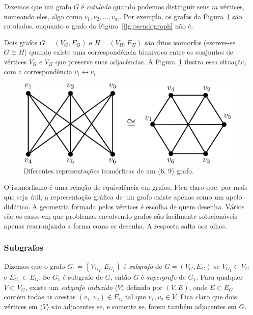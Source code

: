 \documentclass[a4paper,12pt]{article}
\begin{document}
Dizemos que um grafo $G$ é \textit{rotulado} quando podemos distinguir seus $m$ vértices, nomeando eles, algo como $v_1, v_2, \dots, v_m$. Por exemplo, os grafos da Figura~\ref{fig:graphisomorphic} são rotulados, enquanto o grafo da Figura~\ref{fig:pseudograph} não é.

Dois grafos $G = (V_G, E_G)$ e $H = (V_H, E_H)$ são ditos isomorfos (escreve-se $G \cong H$) quando existe uma correspondência biunívoca entre os conjuntos de vértices $V_G$ e $V_H$ que preserve suas adjacências. A Figura~\ref{fig:graphisomorphic} ilustra essa situação, com a correspondência $v_i \longleftrightarrow v_i$.

\begin{figure}[H]
	\begin{center}
		\includegraphics[width=0.6\linewidth]{figures/graphisomorphic.png}
	\end{center}
	\caption{Diferentes representações isomórficas de um (6, 9) grafo.}
	\label{fig:graphisomorphic}
\end{figure}

O isomorfismo é uma relação de equivalência em grafos. Fica claro que, por mais que seja útil, a representação gráfica de um grafo existe apenas como um apelo didático. A geometria formada pelos vértices é escolha de quem desenha. Vários são os casos em que problemas envolvendo grafos são facilmente solucionáveis apenas rearranjando a forma como se desenha. A resposta salta aos olhos.

\subsubsection*{Subgrafos}

Dizemos que o grafo $G_1 = (V_{G_1}, E_{G_1})$ é \textit{subgrafo} de $G = (V_G, E_G)$ se $V_{G_1} \subset V_G$ e $E_{G_1} \subset E_G$. Se $G_1$ é subgrafo de $G$, então $G$ é \textit{supergrafo} de $G_1$. Para qualquer $V \subset V_G$, existe um \textit{subgrafo induzido} $\langle V \rangle$ definido por $(V, E)$, onde $E \subset E_G$ contém todas as arestas $(v_1, v_2) \in E_G$ tal que $v_1, v_2 \in V$. 
Fica claro que dois vértices em $\langle V \rangle$ são adjacentes se, e somente se, forem também adjacentes em $G$.
\end{document}
